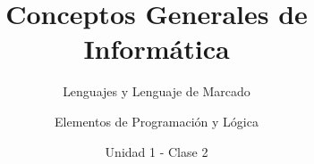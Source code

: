 \documentclass[usenames,dvipsnames]{../../common/beamerUNQaccessible}
\title{Conceptos Generales de Informática}
\subtitle{Lenguajes y Lenguaje de Marcado}
\author{Elementos de Programación y Lógica}
\date{Unidad 1 - Clase 2}
\begin{document}
  \titleframe
  \toc
  
  
  \finaltitleframe
\end{document}
